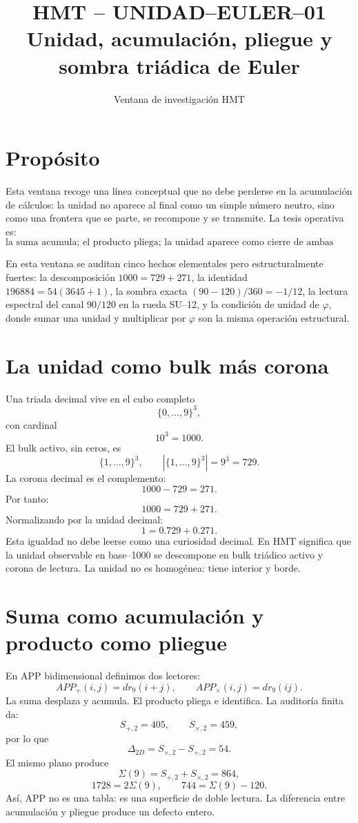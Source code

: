 \documentclass[11pt,a4paper]{article}
\title{\bfseries HMT -- UNIDAD--EULER--01\\Unidad, acumulaci\'on, pliegue y sombra tri\'adica de Euler}
\author{Ventana de investigaci\'on HMT}
\date{}
\begin{document}
\maketitle

\section*{Prop\'osito}
Esta ventana recoge una l\'inea conceptual que no debe perderse en la acumulaci\'on de c\'alculos: la unidad no aparece al final como un simple n\'umero neutro, sino como una frontera que se parte, se recompone y se transmite. La tesis operativa es:
\[
\boxed{\text{la suma acumula; el producto pliega; la unidad aparece como cierre de ambas lecturas.}}
\]

En esta ventana se auditan cinco hechos elementales pero estructuralmente fuertes: la descomposici\'on
\(1000=729+271\), la identidad \(196884=54(3645+1)\), la sombra exacta
\((90-120)/360=-1/12\), la lectura espectral del canal \(90/120\) en la rueda SU--12, y la condici\'on de unidad de \(\varphi\), donde sumar una unidad y multiplicar por \(\varphi\) son la misma operaci\'on estructural.

\section{La unidad como bulk m\'as corona}
Una triada decimal vive en el cubo completo
\[
\{0,\ldots,9\}^3,
\]
con cardinal
\[
10^3=1000.
\]
El bulk activo, sin ceros, es
\[
\{1,\ldots,9\}^3,
\qquad |\{1,\ldots,9\}^3|=9^3=729.
\]
La corona decimal es el complemento:
\[
1000-729=271.
\]
Por tanto:
\[
\boxed{1000=729+271.}
\]
Normalizando por la unidad decimal:
\[
\boxed{1=0.729+0.271.}
\]
Esta igualdad no debe leerse como una curiosidad decimal. En HMT significa que la unidad observable en base--1000 se descompone en bulk tri\'adico activo y corona de lectura. La unidad no es homog\'enea: tiene interior y borde.

\section{Suma como acumulaci\'on y producto como pliegue}
En APP bidimensional definimos dos lectores:
\[
APP_+(i,j)=dr_9(i+j),
\qquad
APP_\times(i,j)=dr_9(ij).
\]
La suma desplaza y acumula. El producto pliega e identifica. La auditor\'ia finita da:
\[
S_{+,2}=405,
\qquad
S_{\times,2}=459,
\]
por lo que
\[
\boxed{\Delta_{2D}=S_{\times,2}-S_{+,2}=54.}
\]
El mismo plano produce
\[
\Sigma(9)=S_{+,2}+S_{\times,2}=864,
\]
\[
1728=2\Sigma(9),
\qquad
744=\Sigma(9)-120.
\]
As\'i, APP no es una tabla: es una superficie de doble lectura. La diferencia entre acumulaci\'on y pliegue produce un defecto entero.
\end{document}
